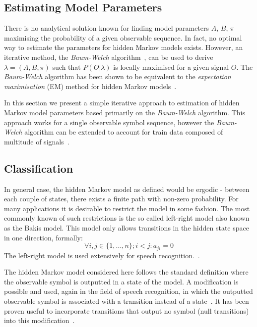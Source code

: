 \subsection{Estimating Model Parameters}

There is no analytical solution known for finding model parameters $A$, $B$, $\pi$ maximising the probability of a given observable sequence. In fact, no optimal way to estimate the parameters for hidden Markov models exists. However, an iterative method, the \emph{Baum-Welch} algorithm~\cite{baum1970}, can be used to derive $\lambda = (A, B, \pi)$ such that $P(O|\lambda)$ is locally maximised for a given signal $O$. The \emph{Baum-Welch} algorithm has been shown to be equivalent to the \emph{expectation maximisation} (EM) method for hidden Markov models~\cite{Dempster1977, wu1983}.

In this section we present a simple iterative approach to estimation of hidden Markov model parameters based primarily on the \emph{Baum-Welch} algorithm. This approach works for a single observable symbol sequence, however the \emph{Baum-Welch} algorithm can be extended to account for train data composed of multitude of signals~\cite{levinson1983, li2000}.



\subsection{Classification}

In general case, the hidden Markov model as defined would be ergodic - between each couple of states, there exists a finite path with non-zero probability. For many applications it is desirable to restrict the model in some fashion. The most commonly known of such restrictions is the so called left-right model also known as the Bakis model. This model only allows transitions in the hidden state space in one direction, formally: $$\forall i,j \in \{1, ..., n\}; i < j: a_{ji} = 0$$
The left-right model is used extensively for speech recognition.~\cite{bakis1976, jelinek1976}.

The hidden Markov model considered here follows the standard definition where the observable symbol is outputted in a state of the model. A modification is possible and used, again in the field of speech recognition, in which the outputted observable symbol is associated with a transition instead of a state~\cite{Rabiner89hmm, jelinek1983}. It has been proven useful to incorporate transitions that output no symbol (null transitions) into this modification~\cite{jelinek1983}.

